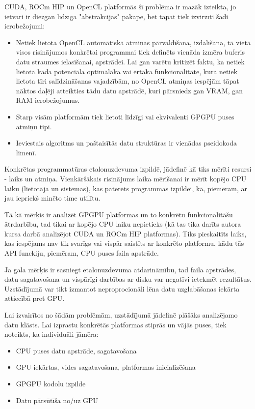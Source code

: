 CUDA, ROCm HIP un OpenCL platformās šī problēma ir mazāk izteikta, jo ietvari
ir diezgan līdzīgā "abstrakcijas" pakāpē, bet tāpat tiek izvirzīti šādi
ierobežojumi:
\begin{itemize}
    \item Netiek lietota OpenCL automātiskā atmiņas pārvaldīšana, izdalīšana,
        tā vietā visos risinājumos konkrētai programmai tiek definēts vienāda
        izmēra buferis datu straumes ielasīšanai, apstrādei. Lai gan varētu kritizēt
        faktu, ka netiek lietota kāda potenciāla optimālāka  vai ērtāka
        funkcionalitāte, kura netiek lietota tīri salīdzināšanas vajadzībām, no
        OpenCL atmiņas iespējām tāpat nāktos daļēji atteikties tādu datu
        apstrādē, kuri pārsniedz gan VRAM, gan RAM ierobežojumus.
    \item Starp visām platformām tiek lietoti līdzīgi vai ekvivalenti GPGPU
        puses atmiņu tipi.
    \item Ieviestais algoritms un paštaisītās datu struktūras ir vienādas
        pseidokoda līmenī.
\end{itemize}


Konkrētas programmatūras etalonuzdevuma izpildē, jādefinē kā tiks mērīti
resursi - laiks un atmiņa. Vienkāršākais risinājums laika mērīšanai ir mērīt
kopējo CPU laiku (lietotāja un sistēmas), kas paterēts programmas izpildei, kā,
piemēram, ar jau iepriekš minēto time utilītu.

Tā kā mērķis ir analizēt GPGPU platformas un to konkrētu funkcionalitāšu
ātrdarbību, tad tikai ar kopējo CPU laiku nepietieks (kā tas tika darīts autora
kursa darbā analizējot CUDA un ROCm HIP platformas\cite{kursa-darbs}). Tiks
pieskaitīts laiks, kas iespējams nav tik svarīgs vai vispār saistīts ar
konkrēto platformu, kādu tās API funckiju, piemēram, CPU puses faila apstrāde.

Ja gala mērķis ir sasniegt etalonuzdevuma atdarināmību, tad faila apstrādes,
datu sagatavošana un vispārīgi darbības ar disku var negatīvi ietekmēt
rezultātus. Uzstādījumā var tikt izmantot neproprocionāli lēna datu
uzglabāšanas iekārta attiecībā pret GPU.

Lai izvairītos no šādām problēmām, uzstādījumā jādefinē plāšāks
analizējamo datu klāsts. Lai izprastu konkrētās platformas stiprās un vājās
puses, tiek noteikts, ka individuāli jāmēra:
\begin{itemize}
    \item CPU puses datu apstrāde, sagatavošana
    \item GPU iekārtas, vides sagatavošana, platformas inicializēšana
    \item GPGPU kodolu izpilde
    \item Datu pārsūtīša no/uz GPU
\end{itemize}

